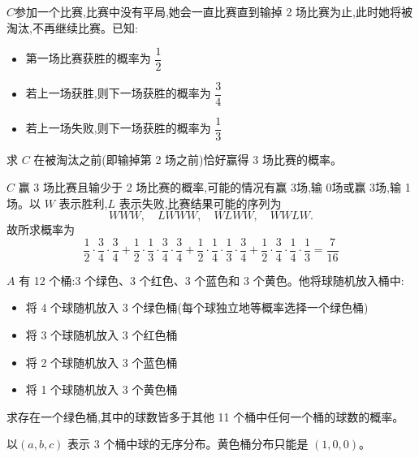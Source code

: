 \begin{questions}
    \question $C$参加一个比赛,比赛中没有平局,她会一直比赛直到输掉 2 场比赛为止,此时她将被淘汰,不再继续比赛。已知:
    \begin{itemize}
        \item 第一场比赛获胜的概率为 $\dfrac{1}{2}$
        \item 若上一场获胜,则下一场获胜的概率为 $\dfrac{3}{4}$
        \item 若上一场失败,则下一场获胜的概率为 $\dfrac{1}{3}$
    \end{itemize}
    求 $C$ 在被淘汰之前(即输掉第 2 场之前)恰好赢得 3 场比赛的概率。
    \begin{solution}
        $C$ 赢 3 场比赛且输少于 2 场比赛的概率,可能的情况有赢 3场,输 0场或赢 3场,输 1场。以 $W$ 表示胜利,$L$ 表示失败,比赛结果可能的序列为
        \[
        WWW, \quad LWWW, \quad WLWW, \quad WWLW.
        \]
        故所求概率为
        \[
        \frac{1}{2}\cdot\frac{3}{4}\cdot\frac{3}{4} + \frac{1}{2}\cdot\frac{1}{3}\cdot\frac{3}{4}\cdot\frac{3}{4} + \frac{1}{2}\cdot\frac{1}{4}\cdot\frac{1}{3}\cdot\frac{3}{4} + \frac{1}{2}\cdot\frac{3}{4}\cdot\frac{1}{4}\cdot\frac{1}{3} = \frac{7}{16}
        \]
    \end{solution}

    \question $A$ 有 12 个桶:3 个绿色、3 个红色、3 个蓝色和 3 个黄色。他将球随机放入桶中:
    \begin{itemize}
        \item 将 4 个球随机放入 3 个绿色桶(每个球独立地等概率选择一个绿色桶)
        \item 将 3 个球随机放入 3 个红色桶
        \item 将 2 个球随机放入 3 个蓝色桶
        \item 将 1 个球随机放入 3 个黄色桶
    \end{itemize}
    求存在一个绿色桶,其中的球数皆多于其他 11 个桶中任何一个桶的球数的概率。
    \begin{solution}
        以$(a,b,c)$ 表示 3 个桶中球的无序分布。黄色桶分布只能是 $(1,0,0)$。


\end{solution}
\end{questions}
